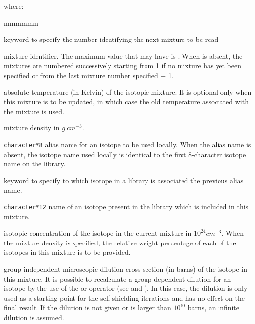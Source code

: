 \noindent
where:

\begin{ListeDeDescription}{mmmmmm}

\item[\moc{MIX}] keyword to specify the number identifying the next mixture to
be read.

\item[\dusa{matnum}] mixture identifier. The maximum value that 
may have is . When  is absent, the mixtures are
numbered successively starting from 1 if no mixture has yet been specified or
from the last mixture number specified + 1.

\item[\dusa{temp}] absolute temperature (in Kelvin) of the isotopic mixture.
It is optional only when this mixture is to be updated, in which case the old
temperature associated with the mixture is used.

\item[\dusa{denmix}] mixture density in $g \ cm^{-3}$. 

\item[\dusa{NAMALI}] {\tt character*8} alias name for an isotope to be used
locally. When the alias name is absent, the isotope name used locally is
identical to the first 8-character isotope name on the library.

\item[\moc{=}] keyword to specify to which isotope in a library is associated
the previous alias name.

\item[\dusa{NAMISO}] {\tt character*12} name of an isotope present in the
library which is included in this mixture.

\item[\dusa{dens}]  isotopic concentration of the isotope  in the
current mixture in $10^{24}cm^{-3}$.  When the mixture density  
is specified, the relative weight percentage of each of the isotopes in this
mixture is to be provided.

\item[\dusa{dil}] group independent microscopic dilution cross section (in
barns) of the isotope  in this mixture. It is possible to
recalculate a group dependent dilution for an isotope by the use of the
 or  operator (see  and ). In this case, the dilution is only used
as a starting point for the self-shielding iterations and has no effect on the
final result. If the dilution is not given or is larger than $10^{10}$ barns,
an infinite dilution is assumed.


\end{ListeDeDescription}
